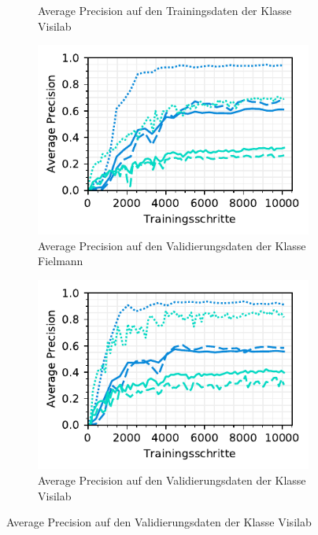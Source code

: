 \begin{figure}[h!]
\begin{subfigure}[b]{0.45\linewidth}
    \caption{Average Precision auf den Trainingsdaten der Klasse Visilab} 
    \label{fig:specific-ie:visilab:ap_train}
    \vspace{2ex}
  \end{subfigure}
  \begin{subfigure}[b]{0.45\linewidth}
    \centering
    \includegraphics[scale=1]{graphics/matplot/img-detection__fielmann__ap.pdf}
    \caption{Average Precision auf den Validierungsdaten der Klasse Fielmann} 
    \label{fig:specific-ie:fielmann:ap_val}
    \vspace{2ex}
  \end{subfigure}%
  \begin{subfigure}[b]{0.45\linewidth}
    \centering
    \includegraphics[scale=1]{graphics/matplot/img-detection__visilab__ap.pdf}
    \caption{Average Precision auf den Validierungsdaten der Klasse Visilab} 
    \label{fig:specific-ie:visilab:ap_val}
    \vspace{2ex}
  \end{subfigure}
\end{figure}

